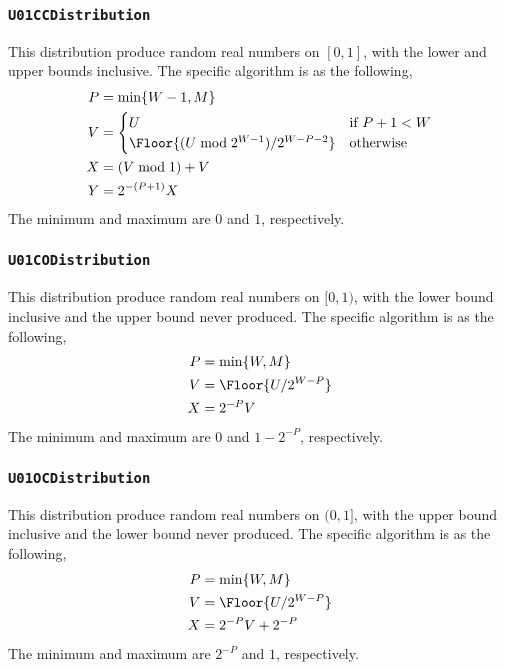 \subsubsection{\texttt{U01CCDistribution}}

This distribution produce random real numbers on $[0, 1]$, with the lower and
upper bounds inclusive. The specific algorithm is as the following,
\begin{align*}
  P &= \min\{W - 1, M\} \\
  V &= \begin{cases}
    U &\text{if } P + 1 < W \\
    \Floor{(U \bmod 2^{W - 1}) / 2^{W - P -2}} &\text{otherwise}
  \end{cases} \\
  X &= (V \bmod 1) + V \\
  Y &= 2^{-(P + 1)} X
\end{align*}
The minimum and maximum are $0$ and $1$, respectively.

\subsubsection{\texttt{U01CODistribution}}

This distribution produce random real numbers on $[0, 1)$, with the lower bound
inclusive and the upper bound never produced. The specific algorithm is as the
following,
\begin{align*}
  P &= \min\{W, M\} \\
  V &= \Floor{U / 2^{W - P}} \\
  X &= 2^{-P} V
\end{align*}
The minimum and maximum are $0$ and $1 - 2^{-P}$, respectively.

\subsubsection{\texttt{U01OCDistribution}}

This distribution produce random real numbers on $(0, 1]$, with the upper bound
inclusive and the lower bound never produced. The specific algorithm is as the
following,
\begin{align*}
  P &= \min\{W, M\} \\
  V &= \Floor{U / 2^{W - P}} \\
  X &= 2^{-P} V + 2^{-P}
\end{align*}
The minimum and maximum are $2^{-P}$ and $1$, respectively.

